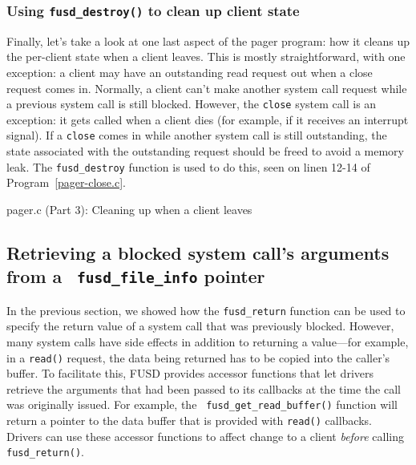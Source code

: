 \documentclass{article}
\begin{document}
\subsubsection{Using {\tt fusd\_destroy()} to clean up client state}
\label{fusd-destroy}

Finally, let's take a look at one last aspect of the pager program:
how it cleans up the per-client state when a client leaves.  This is
mostly straightforward, with one exception: a client may have an
outstanding read request out when a close request comes in.  Normally,
a client can't make another system call request while a previous
system call is still blocked.  However, the {\tt close} system call is
an exception: it gets called when a client dies (for example, if it
receives an interrupt signal).  If a {\tt close} comes in while
another system call is still outstanding, the state associated with
the outstanding request should be freed to avoid a memory leak.  The
{\tt fusd\_destroy} function is used to do this, seen on linen 12-14
of Program~\ref{pager-close.c}.

\begin{Program}
\caption{pager.c (Part 3): Cleaning up when a client leaves}
\label{pager-close.c}
\end{Program}


\subsection{Retrieving a blocked system call's arguments from a {\tt
fusd\_file\_info} pointer}

\label{logring}

In the previous section, we showed how the {\tt fusd\_return} function
can be used to specify the return value of a system call that was
previously blocked.  However, many system calls have side effects in
addition to returning a value---for example, in a {\tt read()}
request, the data being returned has to be copied into the caller's
buffer.  To facilitate this, FUSD provides accessor functions that let
drivers retrieve the arguments that had been passed to its callbacks
at the time the call was originally issued.  For example, the {\tt
fusd\_get\_read\_buffer()} function will return a pointer to the data
buffer that is provided with {\tt read()} callbacks.  Drivers can use
these accessor functions to affect change to a client {\em before}
calling {\tt fusd\_return()}.
\end{document}
